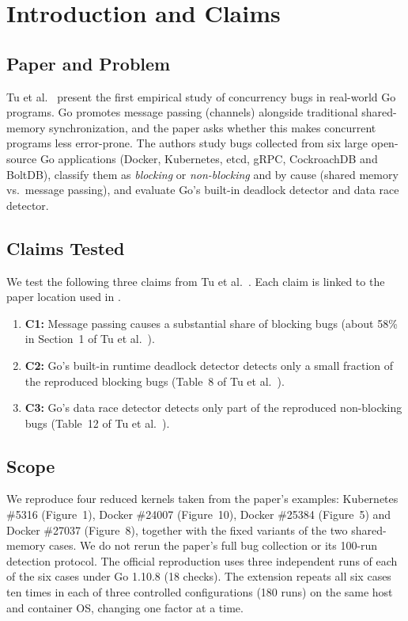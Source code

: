 \section{Introduction and Claims}
\label{sec:intro}

\subsection{Paper and Problem}
Tu et al.~\cite{tu2019go} present the first empirical study of concurrency bugs in
real-world Go programs. Go promotes message passing (channels) alongside traditional
shared-memory synchronization, and the paper asks whether this makes concurrent
programs less error-prone. The authors study bugs collected from six large open-source
Go applications (Docker, Kubernetes, etcd, gRPC, CockroachDB and BoltDB), classify them
as \emph{blocking} or \emph{non-blocking} and by cause (shared memory vs.\ message
passing), and evaluate Go's built-in deadlock detector and data race detector.

\subsection{Claims Tested}
We test the following three claims from Tu et al.~\cite{tu2019go}. Each claim is
linked to the paper location used in .
\begin{enumerate}
  \item \textbf{C1:} Message passing causes a substantial share of blocking bugs
        (about 58\% in Section~1 of Tu et al.~\cite{tu2019go}).
  \item \textbf{C2:} Go's built-in runtime deadlock detector detects only a small
        fraction of the reproduced blocking bugs (Table~8 of Tu et al.~\cite{tu2019go}).
  \item \textbf{C3:} Go's data race detector detects only part of the reproduced
        non-blocking bugs (Table~12 of Tu et al.~\cite{tu2019go}).
\end{enumerate}

\subsection{Scope}
We reproduce four reduced kernels taken from the paper's examples:
Kubernetes \#5316 (Figure~1), Docker \#24007 (Figure~10), Docker \#25384 (Figure~5)
and Docker \#27037 (Figure~8), together with the fixed variants of the two
shared-memory cases. We do not rerun the paper's full bug collection or its
100-run detection protocol. The official reproduction uses three independent
runs of each of the six cases under Go 1.10.8 (18 checks). The extension repeats
all six cases ten times in each of three controlled configurations (180 runs)
on the same host and container OS, changing one factor at a time.
